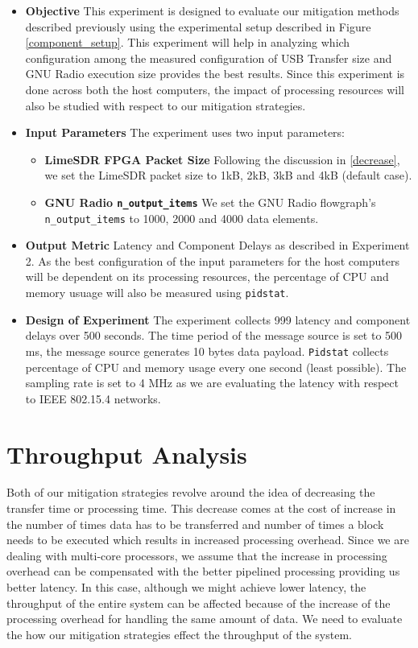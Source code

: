 \begin{itemize}
    \item \textbf{Objective} This experiment is designed to evaluate our mitigation methods described previously using the experimental setup described in Figure \ref{component_setup}.
    This experiment will help in analyzing which configuration among the measured configuration of USB Transfer size and GNU Radio execution size provides the best results.
    Since this experiment is done across both the host computers, the impact of processing resources will also be studied with respect to our mitigation strategies.
    \item \textbf{Input Parameters} The experiment uses two input parameters:
    \begin{itemize}
        \item \textbf{LimeSDR FPGA Packet Size} Following the discussion in \ref{decrease}, we set the LimeSDR packet size to 1kB, 2kB, 3kB and 4kB (default case).
        \item \textbf{GNU Radio \texttt{n\_output\_items}} We set the GNU Radio flowgraph's \texttt{n\_output\_items} to 1000, 2000 and  4000 data elements. 
    \end{itemize}
    \item \textbf{Output Metric} Latency and Component Delays as described in Experiment 2.
    As the best configuration of the input parameters for the host computers will be dependent on its processing resources, the percentage of CPU and memory usuage will also be measured using \texttt{pidstat}.
    \item \textbf{Design of Experiment} The experiment collects 999 latency and component delays over 500 seconds. The time period of the message source is set to 500 ms, the message source generates 10 bytes data payload. \texttt{Pidstat} collects percentage of CPU and memory usage every one second (least possible). The sampling rate is set to 4 MHz as we are evaluating the latency with respect to IEEE 802.15.4 networks.
\end{itemize}

\section{Throughput Analysis}
Both of our mitigation strategies revolve around the idea of decreasing the transfer time or processing time.
This decrease comes at the cost of increase in the number of times data has to be transferred and number of times a block needs to be executed which results in increased processing overhead.
Since we are dealing with multi-core processors, we assume that the increase in processing overhead can be compensated with the better pipelined processing providing us better latency.
In this case, although we might achieve lower latency, the throughput of the entire system can be affected because of the increase of the processing overhead for handling the same amount of data.
We need to evaluate the how our mitigation strategies effect the throughput of the system.\\

